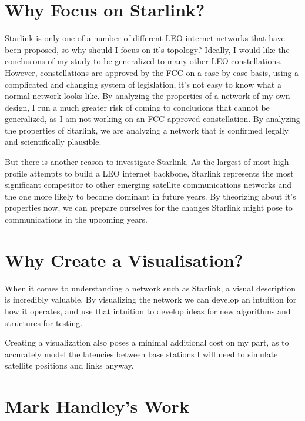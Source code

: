\documentclass[12pt,a4paper,twoside,openright]{report}
\begin{document}
\section{Why Focus on Starlink?}

Starlink is only one of a number of different LEO internet networks that have been proposed, so why should I focus on it's topology? Ideally, I would like the conclusions of my study to be generalized to many other LEO constellations. However, constellations are approved by the FCC on a case-by-case basis, using a complicated and changing system of legislation, it's not easy to know what a normal network looks like. By analyzing the properties of a network of my own design, I run a much greater risk of coming to conclusions that cannot be generalized, as I am not working on an FCC-approved constellation. By analyzing the properties of Starlink, we are analyzing a network that is confirmed legally and scientifically plausible.

But there is another reason to investigate Starlink. As the largest of most high-profile attempts to build a LEO internet backbone, Starlink represents the most significant competitor to other emerging satellite communications networks and the one more likely to become dominant in future years. By theorizing about it's properties now, we can prepare ourselves for the changes Starlink might pose to communications in the upcoming years.

\section{Why Create a Visualisation?}
When it comes to understanding a network such as Starlink, a visual description is incredibly valuable. By visualizing the network we can develop an intuition for how it operates, and use that intuition to develop ideas for new algorithms and structures for testing.

Creating a visualization also poses a minimal additional cost on my part, as to accurately model the latencies between base stations I will need to simulate satellite positions and links anyway.

\section{Mark Handley's Work}
\end{document}
